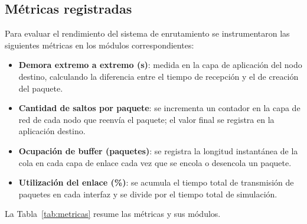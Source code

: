 \documentclass[10pt,letterpaper,twocolumn]{article}
\newcommand{\coltablesetup}{%
  \scriptsize
  \setlength{\tabcolsep}{3pt}%
  \renewcommand{\arraystretch}{1.08}%
}
\begin{document}
\subsection{Métricas registradas}
Para evaluar el rendimiento del sistema de enrutamiento se instrumentaron las siguientes métricas en los módulos correspondientes:
\begin{itemize}
    \item \textbf{Demora extremo a extremo (s)}: medida en la capa de aplicación del nodo destino, calculando la diferencia entre el tiempo de recepción y el de creación del paquete.
    \item \textbf{Cantidad de saltos por paquete}: se incrementa un contador en la capa de red de cada nodo que reenvía el paquete; el valor final se registra en la aplicación destino.
    \item \textbf{Ocupación de buffer (paquetes)}: se registra la longitud instantánea de la cola en cada capa de enlace cada vez que se encola o desencola un paquete.
    \item \textbf{Utilización del enlace (\%)}: se acumula el tiempo total de transmisión de paquetes en cada interfaz y se divide por el tiempo total de simulación.
\end{itemize}

La Tabla~\ref{tab:metricas} resume las métricas y sus módulos.

\begin{table}[!ht]
  \centering
  \caption{Métricas instrumentadas en el simulador.}
  \label{tab:metricas}
  \coltablesetup
\end{table}
\end{document}
